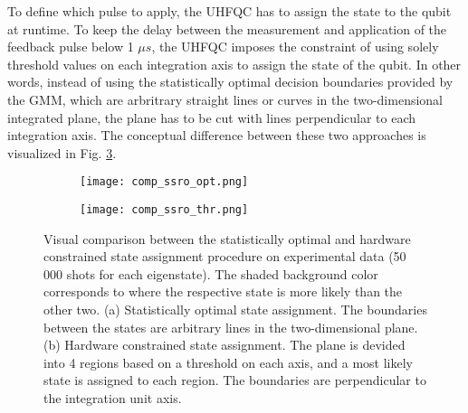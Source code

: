To define which pulse to apply, the UHFQC has to assign the state to the qubit at runtime. To keep the delay between the measurement and application of the feedback pulse below 1 $\mu s$, the UHFQC imposes the constraint of using  solely threshold values on each integration axis to assign the state of the qubit. In other words, instead of using the statistically optimal decision boundaries provided by the GMM, which are arbritrary straight lines or curves in the two-dimensional integrated plane, the plane has to be cut with lines perpendicular to each integration axis. The conceptual difference between these two approaches is visualized in Fig. \ref{fig:comp_ssro_opt_thr}. 

\begin{figure}[ht]
  \centering
  \begin{subfigure}[t]{0.45\textwidth}
     \centering 
     \texttt{[image: comp\_ssro\_opt.png]}
     \caption{ }
     \label{fig:comp_ssro_opt}
  \end{subfigure}
  \hspace{5pt}
  \begin{subfigure}[t]{0.45\textwidth}
     \centering 
     \texttt{[image: comp\_ssro\_thr.png]}
     \caption{ }
     \label{fig:comp_ssro_thr}
  \end{subfigure}
   \caption{Visual comparison between the statistically optimal and hardware constrained state assignment procedure on experimental data (50 000 shots for each eigenstate). The shaded background color corresponds to where the respective state is more likely than the other two. (a) Statistically optimal state assignment. The boundaries between the states are arbitrary lines in the two-dimensional plane. (b) Hardware constrained state assignment. The plane is devided into 4 regions based on a threshold on each axis, and a most likely state is assigned to each region. The boundaries are perpendicular to the integration unit axis.}
  \label{fig:comp_ssro_opt_thr}
\end{figure}

